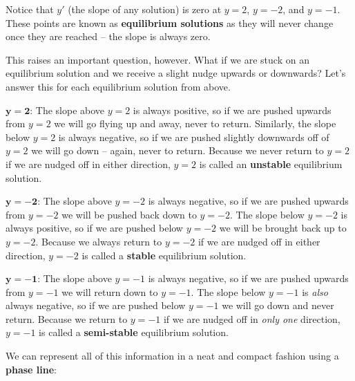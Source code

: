 Notice that $y'$ (the slope of any solution) is zero at $y = 2$, $y = -2$, and $y = -1$. These points are known as \textbf{equilibrium solutions} as they will never change once they are reached – the slope is always zero.

This raises an important question, however. What if we are stuck on an equilibrium solution and we receive a slight nudge upwards or downwards? Let's answer this for each equilibrium solution from above.

$\bm{y = 2}$: The slope above $y = 2$ is always positive, so if we are pushed upwards from $y = 2$ we will go flying up and away, never to return. Similarly, the slope below $y = 2$ is always negative, so if we are pushed slightly downwards off of $y = 2$ we will go down – again, never to return. Because we never return to $y = 2$ if we are nudged off in either direction, $y = 2$ is called an \textbf{unstable} equilibrium solution.

$\bm{y = -2}$: The slope above $y = -2$ is always negative, so if we are pushed upwards from $y = -2$ we will be pushed back down to $y = -2$. The slope below $y = -2$ is always positive, so if we are pushed below $y = -2$ we will be brought back up to $y = -2$. Because we always return to $y = -2$ if we are nudged off in either direction, $y = -2$ is called a \textbf{stable} equilibrium solution.

$\bm{y = -1}$: The slope above $y = -1$ is always negative, so if we are pushed upwards from $y = -1$ we will return down to $y = -1$. The slope below $y = -1$ is \textit{also} always negative, so if we are pushed below $y = -1$ we will go down and never return. Because we return to $y = -1$ if we are nudged off in \textit{only one} direction, $y = -1$ is called a \textbf{semi-stable} equilibrium solution.

We can represent all of this information in a neat and compact fashion using a \textbf{phase line}:

